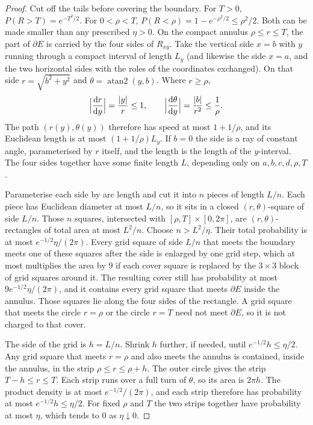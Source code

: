 \begin{proof}
Cut off the tails before covering the boundary. For $T>0$, $P(R>T)=e^{-T^2/2}$. For $0<\rho<T$, $P(R<\rho)=1-e^{-\rho^2/2}\le\rho^2/2$. Both can be made smaller than any prescribed $\eta>0$. On the compact annulus $\rho\le r\le T$, the part of $\partial E$ is carried by the four sides of $R_{xy}$. Take the vertical side $x=b$ with $y$ running through a compact interval of length $L_y$ (and likewise the side $x=a$, and the two horizontal sides with the roles of the coordinates exchanged). On that side $r=\sqrt{b^2+y^2}$ and $\theta=\operatorname{atan2}(y,b)$. Where $r\ge\rho$,
\[
 \Bigl|\frac{\mathrm dr}{\mathrm dy}\Bigr|=\frac{|y|}{r}\le 1,
 \qquad
 \Bigl|\frac{\mathrm d\theta}{\mathrm dy}\Bigr|=\frac{|b|}{r^2}\le\frac1\rho.
\]
The path $(r(y),\theta(y))$ therefore has speed at most $1+1/\rho$, and its Euclidean length is at most $(1+1/\rho)L_y$. If $b=0$ the side is a ray of constant angle, parameterised by $r$ itself, and the length is the length of the $y$-interval. The four sides together have some finite length $L$, depending only on $a,b,c,d,\rho,T$.

Parameterise each side by arc length and cut it into $n$ pieces of length $L/n$. Each piece has Euclidean diameter at most $L/n$, so it sits in a closed $(r,\theta)$-square of side $L/n$. Those $n$ squares, intersected with $[\rho,T]\times[0,2\pi]$, are $(r,\theta)$-rectangles of total area at most $L^2/n$. Choose $n>L^2/\eta$. Their total probability is at most $e^{-1/2}\eta/(2\pi)$. Every grid square of side $L/n$ that meets the boundary meets one of these squares after the side is enlarged by one grid step, which at most multiplies the area by $9$ if each cover square is replaced by the $3\times 3$ block of grid squares around it. The resulting cover still has probability at most $9e^{-1/2}\eta/(2\pi)$, and it contains every grid square that meets $\partial E$ inside the annulus. Those squares lie along the four sides of the rectangle. A grid square that meets the circle $r=\rho$ or the circle $r=T$ need not meet $\partial E$, so it is not charged to that cover.

The side of the grid is $h=L/n$. Shrink $h$ further, if needed, until $e^{-1/2}h\le\eta/2$. Any grid square that meets $r=\rho$ and also meets the annulus is contained, inside the annulus, in the strip $\rho\le r\le\rho+h$. The outer circle gives the strip $T-h\le r\le T$. Each strip runs over a full turn of $\theta$, so its area is $2\pi h$. The product density is at most $e^{-1/2}/(2\pi)$, and each strip therefore has probability at most $e^{-1/2}h\le\eta/2$. For fixed $\rho$ and $T$ the two strips together have probability at most $\eta$, which tends to $0$ as $\eta\downarrow0$.


\end{proof}
